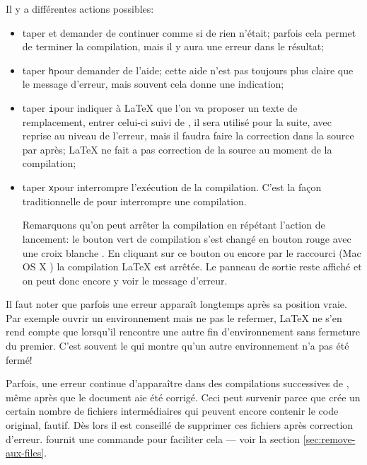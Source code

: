 Il y a différentes actions possibles:
\begin{itemize}
\item taper \Return et demander de continuer comme si de rien n'était; parfois cela permet de terminer la compilation, mais il y aura une erreur dans le résultat;
\item taper \verb+h+\Return pour demander de l'aide; cette aide n'est pas toujours plus claire que le message d'erreur, mais souvent cela donne une indication;
\item taper \verb+i+\Return pour indiquer à \LaTeX{} que l'on va proposer un texte de remplacement, entrer celui-ci suivi de \Return, il sera utilisé pour la suite, avec reprise au niveau de l'erreur, mais il faudra faire la correction dans la source par après; \LaTeX{} ne fait a pas correction de la source au moment de la compilation;
\item taper \verb=x=\Return pour interrompre l'exécution de la compilation. C'est la façon traditionnelle de \AllTeX{} pour interrompre une compilation.

Remarquons qu'on peut arrêter la compilation en répétant l'action de lancement: le bouton vert de compilation s'est changé en bouton rouge avec une croix blanche . En cliquant sur ce bouton ou encore par le raccourci  (Mac OS X ) la compilation \LaTeX{} est arrêtée. Le panneau de sortie reste affiché et on peut donc encore y voir le message d'erreur.
\end{itemize}

Il faut noter que parfois une erreur apparaît longtemps après sa position vraie. Par exemple ouvrir un environnement mais ne pas le refermer, \LaTeX{} ne s'en rend compte que lorsqu'il rencontre une autre fin d'environnement sans fermeture du premier. C'est souvent le \verb++ qui montre qu'un autre environnement n'a pas été fermé!

Parfois, une erreur continue d'apparaître dans des compilations successives de \AllTeX{}, même après que le document aie été corrigé. Ceci peut survenir parce que \AllTeX{} crée un certain nombre de fichiers intermédiaires qui peuvent encore contenir le code original, fautif. Dès lors il est conseillé de supprimer ces fichiers après correction d'erreur. \Tw{} fournit une commande pour faciliter cela --- voir la section \ref{sec:remove-aux-files}.

